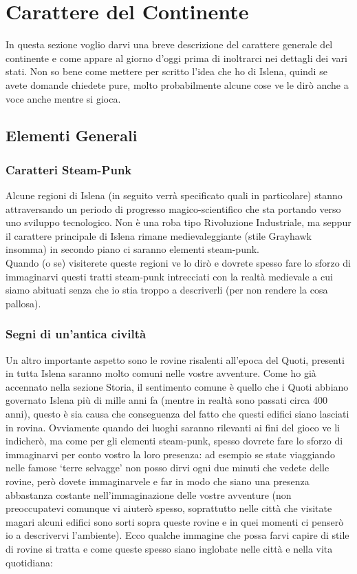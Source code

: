 \documentclass[10pt, a4paper]{report}
\begin{document}
\chapter{Carattere del Continente}

\begin{multicols}{2}
In questa sezione voglio darvi una breve descrizione del carattere generale del continente e come appare al giorno d’oggi prima di inoltrarci nei dettagli dei vari stati. Non so bene come mettere per scritto l’idea che ho di Islena, quindi se avete domande chiedete pure, molto probabilmente alcune cose ve le dirò anche a voce anche mentre si gioca.

\section{Elementi Generali}
\subsection*{Caratteri Steam-Punk}
Alcune regioni di Islena (in seguito verrà specificato quali in particolare) stanno attraversando un periodo di progresso magico-scientifico che sta portando verso uno sviluppo tecnologico. Non è una roba tipo Rivoluzione Industriale, ma seppur il carattere principale di Islena rimane medievaleggiante (stile Grayhawk insomma) in secondo piano ci saranno elementi steam-punk.\\
Quando (o se) visiterete queste regioni ve lo dirò e dovrete spesso fare lo sforzo di immaginarvi questi tratti steam-punk intrecciati con la realtà medievale a cui siamo abituati senza che io stia troppo a descriverli (per non rendere la cosa pallosa).

\subsection*{Segni di un'antica civiltà}
Un altro importante aspetto sono le rovine risalenti all’epoca del Quoti, presenti in tutta Islena saranno molto comuni nelle vostre avventure. Come ho già accennato nella sezione Storia, il sentimento comune è quello che i Quoti abbiano governato Islena più di mille anni fa (mentre in realtà sono passati circa 400 anni), questo è sia causa che conseguenza del fatto che questi edifici siano lasciati in rovina. Ovviamente quando dei luoghi saranno rilevanti ai fini del gioco ve li indicherò, ma come per gli elementi steam-punk, spesso dovrete fare lo sforzo di immaginarvi per conto vostro la loro presenza: ad esempio se state viaggiando nelle famose \enquote*{terre selvagge} non posso dirvi ogni due minuti che vedete delle rovine, però dovete immaginarvele e far in modo che siano una presenza abbastanza costante nell’immaginazione delle vostre avventure (non preoccupatevi comunque vi aiuterò spesso, soprattutto nelle città che visitate magari alcuni edifici sono sorti sopra queste rovine e in quei momenti ci penserò io a descrivervi l’ambiente). Ecco qualche immagine che possa farvi capire di stile di rovine si tratta e come queste spesso siano inglobate nelle città e nella vita quotidiana:\\


\end{multicols}
\end{document}
